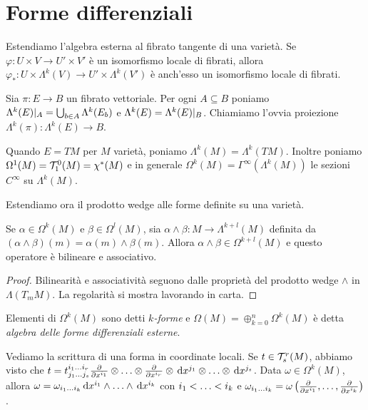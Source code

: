 \section{Forme differenziali}

Estendiamo l'algebra esterna al fibrato tangente di una varietà.
Se $\varphi: U \times V \to U' \times V'$ è un isomorfismo locale di fibrati, allora $\varphi_* : U\times \Lambda^k(V) \to U' \times \Lambda^k(V')$ è anch'esso un isomorfismo locale di fibrati.

\begin{definition}
	Sia $\pi : E\to B$ un fibrato vettoriale. Per ogni $A\subseteq B$ poniamo $\Lambda^k(E)\restrict{A} = \bigcup_{b\in A} \Lambda^k(E_b)$ e $\Lambda^k(E) = \Lambda^k(E) \restrict B$.
	Chiamiamo l'ovvia proiezione $\Lambda^k(\pi) : \Lambda^k(E) \to B$.
\end{definition}

Quando $E = TM$ per $M$ varietà, poniamo $\Lambda^k(M) = \Lambda^k(TM)$. Inoltre poniamo $\Omega^1(M) = \Tau^0_1(M) = \chi^*(M)$ e in generale $\Omega^k(M) = \Gamma^\infty(\Lambda^k(M))$ le sezioni $C^\infty$ su $\Lambda^k(M)$.

Estendiamo ora il prodotto wedge alle forme definite su una varietà.
\begin{proposition}
	Se $\alpha \in \Omega^k(M)$ e $\beta \in \Omega^l(M)$, sia $\alpha \wedge \beta : M \to \Lambda^{k+l}(M)$ definita da $(\alpha\wedge\beta)(m) = \alpha(m) \wedge \beta(m)$. Allora $\alpha\wedge\beta \in \Omega^{k+l}(M)$ e questo operatore è bilineare e associativo.
\end{proposition}
\begin{proof}
	Bilinearità e associatività seguono dalle proprietà del prodotto wedge $\wedge$ in $\Lambda(T_mM)$. La regolarità si mostra lavorando in carta.
\end{proof}

\begin{definition}  
	Elementi di $\Omega^k(M)$ sono detti \emph{$k$-forme} e $\Omega(M) = \oplus_{k=0}^n \Omega^k(M)$ è detta \emph{algebra delle forme differenziali esterne}.
\end{definition}

\begin{remark}
Vediamo la scrittura di una forma in coordinate locali. Se $t\in\Tau^r_s(M)$, abbiamo visto che $t = t^{\seqb ir{}}_{\seqb js{}} \DerParz{}{x^{i_1}} \otimes \ldots \otimes \DerParz{}{x^{i_r}} \otimes \de x^{j_1} \otimes \ldots \otimes \de x^{j_s}$.
Data $\omega \in \Omega^k(M)$, allora $\omega = \omega_{\seqb ik{}} \de x^{i_1} \wedge \ldots \wedge \de x^{i_k}$ con $\seqb ik<$ e $\omega_{\seqb ik{}} = \omega\left(\DerParz{}{x^{i_1}}, \ldots, \DerParz{}{x^{i_k}}\right)$.
\end{remark}

